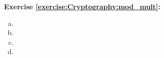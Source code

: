\noindent\textbf{Exercise \ref{exercise:Cryptography:mod_mult}:}
\begin{multicols}{2}
\begin{enumerate}[(a)]
\item

\item

\item

\item
\end{enumerate}
\end{multicols}


